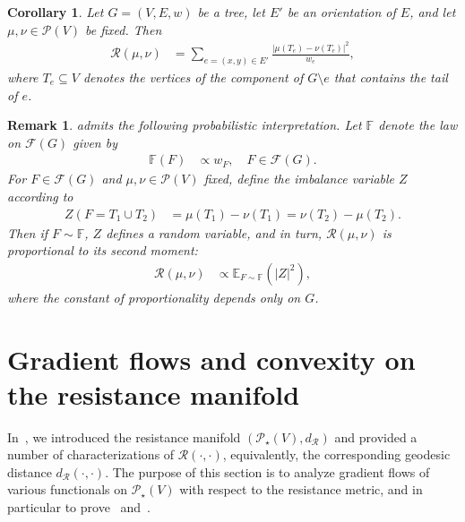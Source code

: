 \documentclass[11pt,a4paper]{article}
\newcommand{\Resis}{\mathcal{R}}
\newcommand{\Forest}{\mathcal{F}}
\newcommand{\Prob}{\mathscr{P}}
\newtheorem{corollary}[theorem]{Corollary}
\newtheorem{remark}[theorem]{Remark}
\begin{document}
\begin{corollary}\label{cor:resistance-tree-forests}
    Let $G=(V,E,w)$ be a tree, let $E'$ be an orientation of $E$, and let $\mu,\nu\in\Prob(V)$ be fixed. Then
        \begin{align*}
            \Resis(\mu,\nu) &= \sum_{e=(x,y)\in E'} \frac{|\mu(T_e) - \nu(T_e)|^2}{w_e},
        \end{align*}
    where $T_e\subseteq V$ denotes the vertices of the component of $G\setminus e$ that contains the tail of $e$.
\end{corollary}

\begin{remark} 
     admits the following probabilistic interpretation. Let $\mathbb{F}$ denote the law on $\Forest (G)$ given by
        \begin{align*}
            \mathbb{F}(F) &\propto w_F,\quad F\in\Forest (G).
        \end{align*}
    For $F\in \Forest (G)$ and $\mu,\nu\in\Prob(V)$ fixed, define the imbalance variable $Z$ according to
        \begin{align*}
            Z(F=T_1\cup T_2) &= \mu(T_1) - \nu(T_1) = \nu(T_2) - \mu(T_2).
        \end{align*}
    Then if $F\sim\mathbb{F}$, $Z$ defines a random variable, and in turn, $\Resis(\mu,\nu)$ is proportional to its second moment:
        \begin{align*}
            \Resis(\mu,\nu) &\propto \mathbb{E}_{F\sim\mathbb{F}}\left({|Z|^2}\right),
        \end{align*}
    where the constant of proportionality depends only on $G$.
\end{remark}

\section{Gradient flows and convexity on the resistance manifold}\label{sec:gradient-flows}

In~, we introduced the resistance manifold $(\Prob_\star(V),d_\Resis)$ and provided a number of characterizations of $\Resis(\cdot,\cdot)$, equivalently, the corresponding geodesic distance $d_\Resis(\cdot,\cdot)$. The purpose of this section is to analyze gradient flows of various functionals on $\Prob_\star(V)$ with respect to the resistance metric, and in particular to prove~ and~.
\end{document}
